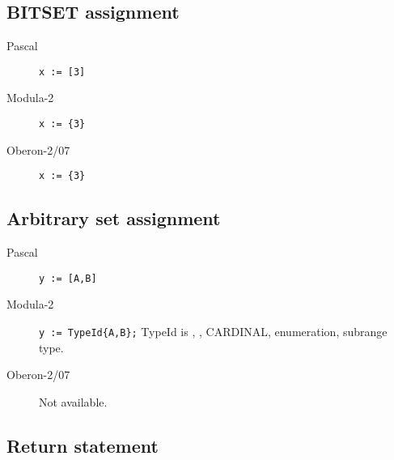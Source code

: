 \documentclass[10pt]{article}
\begin{document}
\subsection{BITSET assignment}

\begin{description}
    \item[Pascal] \lstinline!x := [3]!
    \item[Modula-2] \lstinline!x := {3}!
    \item[Oberon-2/07] \lstinline!x := {3}!
\end{description}

\subsection{Arbitrary set assignment}

\begin{description}
    \item[Pascal] \lstinline!y := [A,B]!
    \item[Modula-2] \lstinline!y := TypeId{A,B};! TypeId is \CHAR, \INTEGER, CARDINAL, enumeration, subrange type.
    \item[Oberon-2/07] Not available.
\end{description}

\subsection{Return statement}
\end{document}
